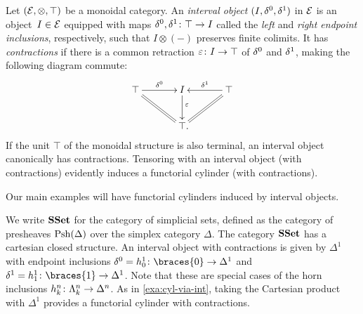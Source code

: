 \documentclass[reqno,10pt,a4paper,oneside,draft]{amsart}
\begin{document}
\begin{example} \label{exa:cyl-via-int}
Let $(\mathcal{E}, \otimes, \top)$ be a monoidal category.
An \emph{interval object} $(I, \delta^0, \delta^1)$ in $\mathcal{E}$ is an object~$I \in \mathcal{E}$ equipped with maps $\delta^0, \delta^1 \colon \top \to I$ called the \emph{left} and \emph{right endpoint inclusions}, respectively, such that $I \otimes (-)$ preserves finite colimits.
It has \emph{contractions} if there is a common retraction $\varepsilon \colon I \to \top$ of $\delta^0$ and $\delta^1$, making the following diagram commute:
\[
\xymatrix@C+1em{
  \top
  \ar[r]^-{\lcyl}
  \ar@{=}[dr]
&
  \interval
  \ar[d]^(0.4){\ccyl}
&
  \top
  \ar[l]_-{\rcyl}
  \ar@{=}[dl]
\\&
  \top
\rlap{.}}
\]
If the unit $\top$ of the monoidal structure is also terminal, an interval object canonically has contractions.
Tensoring with an interval object (with contractions) evidently induces a functorial cylinder (with contractions).
\end{example}

Our main examples will have functorial cylinders induced by interval objects.

\begin{example} \label{exa:cyl-in-sset}
We write $\mathbf{SSet}$ for the category of simplicial sets, defined as the category of presheaves $\mathrm{Psh}(\Delta)$ over the simplex category $\Delta$.
The category $\mathbf{SSet}$ has a cartesian closed structure.
An interval object with contractions is given by $\Delta^1$ with endpoint inclusions $\lcyl = h_0^1 \co \braces{0} \to \Delta^1$ and $\rcyl = h_1^1 \co \braces{1} \to \Delta^1$.
Note that these are special cases of the horn inclusions $h_k^n \colon \Lambda_k^n \to \Delta^n$.
As in \cref{exa:cyl-via-int}, taking the Cartesian product with $\Delta^1$ provides a functorial cylinder with contractions.
\end{example}
\end{document}
